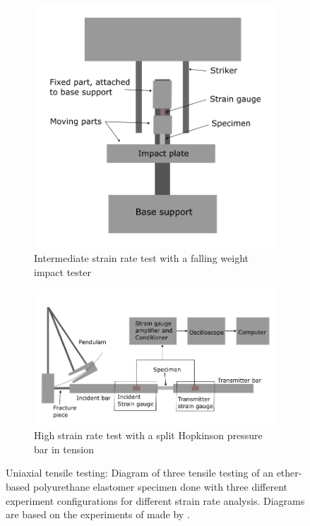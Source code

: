 \begin{figure}
\begin{subfigure}[b]{0.45\textwidth}
        \includegraphics[width=\textwidth]{Images/chapter1/uniaxialintermediate.png}
        \caption{Intermediate strain rate test with a falling weight impact tester}
        \label{fig:subfiginter}
        \end{subfigure}
        \vspace{0.5cm}
        \begin{subfigure}[b]{0.7\textwidth}
        \centering
        \includegraphics[width=\textwidth]{Images/chapter1/uniaxialhigh.png}
        \caption{High strain rate test with a split Hopkinson pressure bar in tension}
        \label{fig:subfighigh}
        \end{subfigure}  
        \hspace{0.3cm}

        \caption[Uniaxial tensile testing of ether-based polyurethane, \citet{Kanyanta2010}]{Uniaxial tensile testing: Diagram of three tensile testing of an ether-based polyurethane elastomer specimen done with three different experiment configurations for different strain rate analysis. Diagrams are based on the experiments of made by \citet{Kanyanta2010}.}
        \label{fig:uniaxialkan}
\end{figure}

